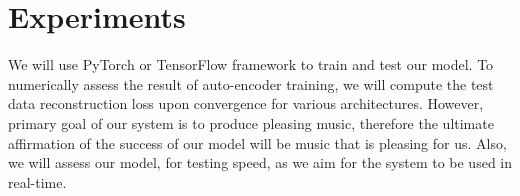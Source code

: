 \documentclass[conference]{IEEEtran}
\begin{document}
\section{Experiments}
We will use PyTorch \cite{pytorch} or TensorFlow \cite{tensorflow} framework to train and test our model. To numerically assess the result of auto-encoder training, we will compute the test data reconstruction loss upon convergence for various architectures. However, primary goal of our system is to produce pleasing music, therefore the ultimate affirmation of the success of our model will be music that is pleasing for us. Also, we will assess our model, for testing speed, as we aim for the system to be used in real-time.



\end{document}
